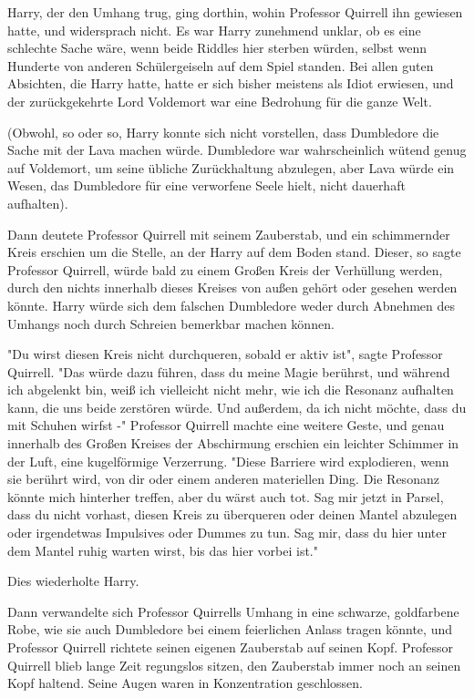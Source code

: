 {Harry, der den Umhang trug, ging dorthin, wohin Professor Quirrell ihn gewiesen hatte, und widersprach nicht. Es war Harry zunehmend unklar, ob es eine schlechte Sache wäre, wenn beide Riddles hier sterben würden, selbst wenn Hunderte von anderen Schülergeiseln auf dem Spiel standen. Bei allen guten Absichten, die Harry hatte, hatte er sich bisher meistens als Idiot erwiesen, und der zurückgekehrte Lord Voldemort war eine Bedrohung für die ganze Welt.

(Obwohl, so oder so, Harry konnte sich nicht vorstellen, dass Dumbledore die Sache mit der Lava machen würde. Dumbledore war wahrscheinlich wütend genug auf Voldemort, um seine übliche Zurückhaltung abzulegen, aber Lava würde ein Wesen, das Dumbledore für eine verworfene Seele hielt, nicht dauerhaft aufhalten).

Dann deutete Professor Quirrell mit seinem Zauberstab, und ein schimmernder Kreis erschien um die Stelle, an der Harry auf dem Boden stand. Dieser, so sagte Professor Quirrell, würde bald zu einem Großen Kreis der Verhüllung werden, durch den nichts innerhalb dieses Kreises von außen gehört oder gesehen werden könnte. Harry würde sich dem falschen Dumbledore weder durch Abnehmen des Umhangs noch durch Schreien bemerkbar machen können.

"Du wirst diesen Kreis nicht durchqueren, sobald er aktiv ist", sagte Professor Quirrell. "Das würde dazu führen, dass du meine Magie berührst, und während ich abgelenkt bin, weiß ich vielleicht nicht mehr, wie ich die Resonanz aufhalten kann, die uns beide zerstören würde. Und außerdem, da ich nicht möchte, dass du mit Schuhen wirfst -" Professor Quirrell machte eine weitere Geste, und genau innerhalb des Großen Kreises der Abschirmung erschien ein leichter Schimmer in der Luft, eine kugelförmige Verzerrung. "Diese Barriere wird explodieren, wenn sie berührt wird, von dir oder einem anderen materiellen Ding. Die Resonanz könnte mich hinterher treffen, aber du wärst auch tot. Sag mir jetzt in Parsel, dass du nicht vorhast, diesen Kreis zu überqueren oder deinen Mantel abzulegen oder irgendetwas Impulsives oder Dummes zu tun. Sag mir, dass du hier unter dem Mantel ruhig warten wirst, bis das hier vorbei ist."

Dies wiederholte Harry.

Dann verwandelte sich Professor Quirrells Umhang in eine schwarze, goldfarbene Robe, wie sie auch Dumbledore bei einem feierlichen Anlass tragen könnte, und Professor Quirrell richtete seinen eigenen Zauberstab auf seinen Kopf. Professor Quirrell blieb lange Zeit regungslos sitzen, den Zauberstab immer noch an seinen Kopf haltend. Seine Augen waren in Konzentration geschlossen.

}
